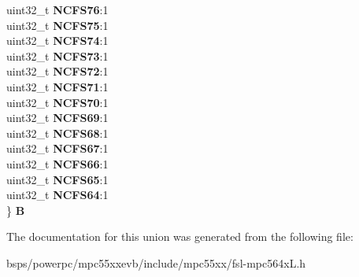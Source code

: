 \begin{DoxyCompactItemize}
\begin{tabbing}
\>uint32\_t {\bfseries NCFS76}:1\\
\>uint32\_t {\bfseries NCFS75}:1\\
\>uint32\_t {\bfseries NCFS74}:1\\
\>uint32\_t {\bfseries NCFS73}:1\\
\>uint32\_t {\bfseries NCFS72}:1\\
\>uint32\_t {\bfseries NCFS71}:1\\
\>uint32\_t {\bfseries NCFS70}:1\\
\>uint32\_t {\bfseries NCFS69}:1\\
\>uint32\_t {\bfseries NCFS68}:1\\
\>uint32\_t {\bfseries NCFS67}:1\\
\>uint32\_t {\bfseries NCFS66}:1\\
\>uint32\_t {\bfseries NCFS65}:1\\
\>uint32\_t {\bfseries NCFS64}:1\\
\} {\bfseries B}\\

\end{tabbing}\end{DoxyCompactItemize}


The documentation for this union was generated from the following file\+:\begin{DoxyCompactItemize}
\item 
bsps/powerpc/mpc55xxevb/include/mpc55xx/fsl-\/mpc564x\+L.\+h\end{DoxyCompactItemize}

